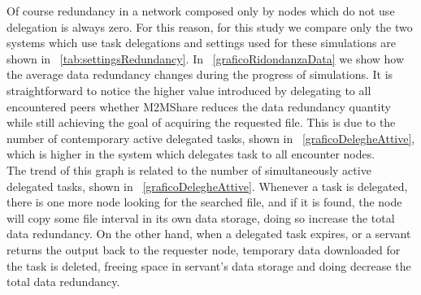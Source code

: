 Of course redundancy in a network composed only by nodes which do not use delegation is always zero. For this reason, for this study we compare only the two systems which use task delegations and settings used for these simulations are shown in \tablename~\ref{tab:settingsRedundancy}. In \figurename~\ref{graficoRidondanzaData} we show how the average data redundancy changes during the progress of simulations. It is straightforward to notice the higher value introduced by delegating to all encountered peers whether M2MShare reduces the data redundancy quantity while still achieving the goal of acquiring the requested file. This is due to the number of contemporary active delegated tasks, shown in \figurename~\ref{graficoDelegheAttive}, which is higher in the system which delegates task to all encounter nodes. 
\\
The trend of this graph is related to the number of simultaneously active delegated tasks, shown in \figurename~\ref{graficoDelegheAttive}. Whenever a task is delegated, there is one more node looking for the searched file, and if it is found, the node will copy some file interval in its own data storage, doing so increase the total data redundancy. On the other hand, when a delegated task expires, or a servant returns the output back to the requester node, temporary data downloaded for the task is deleted, freeing space in servant's data storage and doing decrease the total data redundancy.

